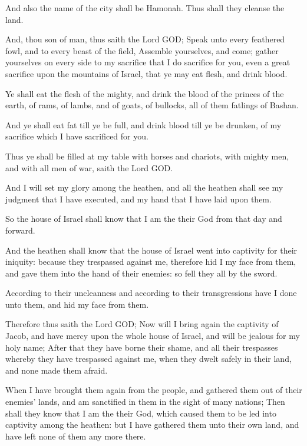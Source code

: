 \verse And also the name of the city shall be Hamonah. Thus shall they cleanse the land.

\verse And, thou son of man, thus saith the Lord GOD; Speak unto every feathered fowl, and to every beast of the field, Assemble yourselves, and come; gather yourselves on every side to my sacrifice that I do sacrifice for you, even a great sacrifice upon the mountains of Israel, that ye may eat flesh, and drink blood.

\verse Ye shall eat the flesh of the mighty, and drink the blood of the princes of the earth, of rams, of lambs, and of goats, of bullocks, all of them fatlings of Bashan.

\verse And ye shall eat fat till ye be full, and drink blood till ye be drunken, of my sacrifice which I have sacrificed for you.

\verse Thus ye shall be filled at my table with horses and chariots, with mighty men, and with all men of war, saith the Lord GOD.

\verse And I will set my glory among the heathen, and all the heathen shall see my judgment that I have executed, and my hand that I have laid upon them.

\verse So the house of Israel shall know that I am the \LORD their God from that day and forward.

\verse And the heathen shall know that the house of Israel went into captivity for their iniquity: because they trespassed against me, therefore hid I my face from them, and gave them into the hand of their enemies: so fell they all by the sword.

\verse According to their uncleanness and according to their transgressions have I done unto them, and hid my face from them.

\verse Therefore thus saith the Lord GOD; Now will I bring again the captivity of Jacob, and have mercy upon the whole house of Israel, and will be jealous for my holy name; \verse After that they have borne their shame, and all their trespasses whereby they have trespassed against me, when they dwelt safely in their land, and none made them afraid.

\verse When I have brought them again from the people, and gathered them out of their enemies' lands, and am sanctified in them in the sight of many nations; \verse Then shall they know that I am the \LORD their God, which caused them to be led into captivity among the heathen: but I have gathered them unto their own land, and have left none of them any more there.

